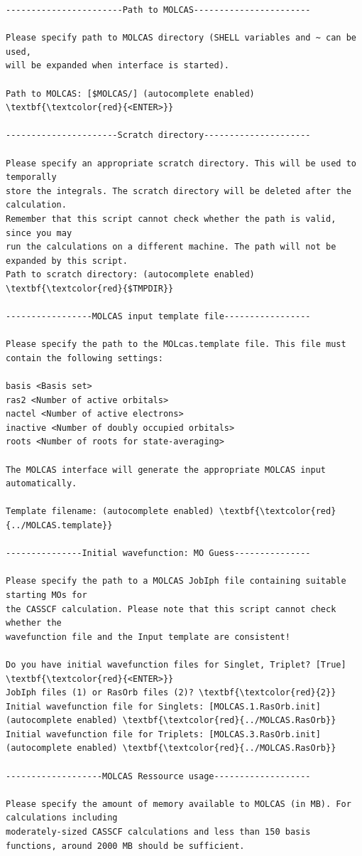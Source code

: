 \documentclass[a4paper,11pt,DIV=15,openany]{scrbook}
\begin{document}
\begin{oframed}
\begin{Verbatim}[commandchars=\\\{\}]
-----------------------Path to MOLCAS-----------------------

Please specify path to MOLCAS directory (SHELL variables and ~ can be used, 
will be expanded when interface is started).

Path to MOLCAS: [$MOLCAS/] (autocomplete enabled) \textbf{\textcolor{red}{<ENTER>}}

----------------------Scratch directory---------------------

Please specify an appropriate scratch directory. This will be used to temporally 
store the integrals. The scratch directory will be deleted after the calculation. 
Remember that this script cannot check whether the path is valid, since you may 
run the calculations on a different machine. The path will not be expanded by this script.
Path to scratch directory: (autocomplete enabled) \textbf{\textcolor{red}{$TMPDIR}}

-----------------MOLCAS input template file-----------------

Please specify the path to the MOLcas.template file. This file must contain the following settings:

basis <Basis set>
ras2 <Number of active orbitals>
nactel <Number of active electrons>
inactive <Number of doubly occupied orbitals>
roots <Number of roots for state-averaging>

The MOLCAS interface will generate the appropriate MOLCAS input automatically.

Template filename: (autocomplete enabled) \textbf{\textcolor{red}{../MOLCAS.template}}

---------------Initial wavefunction: MO Guess---------------

Please specify the path to a MOLCAS JobIph file containing suitable starting MOs for 
the CASSCF calculation. Please note that this script cannot check whether the 
wavefunction file and the Input template are consistent!

Do you have initial wavefunction files for Singlet, Triplet? [True] \textbf{\textcolor{red}{<ENTER>}}
JobIph files (1) or RasOrb files (2)? \textbf{\textcolor{red}{2}}
Initial wavefunction file for Singlets: [MOLCAS.1.RasOrb.init] (autocomplete enabled) \textbf{\textcolor{red}{../MOLCAS.RasOrb}}
Initial wavefunction file for Triplets: [MOLCAS.3.RasOrb.init] (autocomplete enabled) \textbf{\textcolor{red}{../MOLCAS.RasOrb}}

-------------------MOLCAS Ressource usage-------------------

Please specify the amount of memory available to MOLCAS (in MB). For calculations including
moderately-sized CASSCF calculations and less than 150 basis functions, around 2000 MB should be sufficient.


\end{Verbatim}
\end{oframed}
\end{document}
